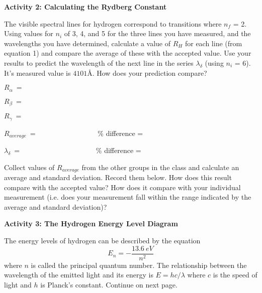 \vspace{0.5in}

\textbf{Activity 2: Calculating the Rydberg Constant}

 
The visible spectral lines for hydrogen correspond to transitions where $n_f$ = 2.  Using values for $n_i$ of 3, 4, and 5 for the three lines you have measured, and the wavelengths you have determined, calculate a value of $R_H$ for each line (from equation 1) and compare the average of these with the accepted value.  
Use your results to predict the wavelength of the next line in the series $\lambda_\delta$ (using $n_i$ = 6). It's measured value is $4101${\AA}.  
How does your prediction compare?     

\noindent $R_\alpha ~ = ~\qquad\qquad\qquad\qquad\qquad$

\answerspace{0.4in}

\noindent $R_\beta ~ = ~\qquad\qquad\qquad\qquad\qquad$

\answerspace{0.4in}

\noindent $R_\gamma ~ =~ \qquad\qquad\qquad\qquad\qquad$

\answerspace{0.4in}

\noindent $R_{average} ~ =~ \qquad\qquad\qquad\qquad$  \% difference = 

\answerspace{0.4in}

\noindent $\lambda_\delta ~ = ~\qquad\qquad\qquad\qquad\qquad$  \% difference =

\answerspace{0.2in}


Collect values of $R_{average}$ from the other groups in the class and calculate 
an average and standard deviation. Record them below.
How does this result compare with the accepted value?
How does it compare with your individual measurement (i.e. does your 
measurement fall within the range indicated by the average and standard 
deviation)?

\answerspace{1.0in}

\textbf{Activity 3: The Hydrogen Energy Level Diagram}

 
The energy levels of hydrogen can be described by the equation
\begin{equation}
E_n = -\frac{13.6~eV}{n^2}
\end{equation}
where $n$ is called the principal quantum number.
The relationship between the wavelength of the emitted light and its energy
is $E=hc/\lambda$ where $c$ is the speed of light and $h$ is Planck's constant.
Continue on next page.

